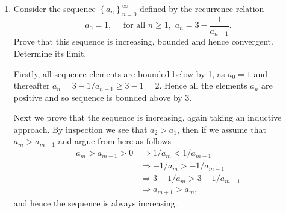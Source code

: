 \documentclass[oneside,10pt]{amsart}
\begin{document}
\begin{enumerate}
\begin{enumerate}
    \item
    Determine the limit.
    \begin{solution}
    Since we now know the limit exists let us denote it by $a$. Then by the algebra of limits theorem the limit $a$ satisfies
\begin{align*}
& a = \sqrt{2 a} \\
\Leftrightarrow \, \, & a = 2.
\end{align*}
\end{solution}
    \end{enumerate}
\item
Consider the sequence $\left \{ a_n \right \}_{n=0}^\infty$ defined by the recurrence relation
\[ a_0 = 1 , \quad \text{ for all } n \geq 1, \, \, a_{n} = 3 - \frac{1}{a_{n-1}}.\]
Prove that this sequence is increasing, bounded and hence convergent. Determine its limit.
\begin{solution}
Firstly, all sequence elements are bounded below by 1, as $a_0 = 1$ and thereafter $a_n = 3 - 1/a_{n-1} \geq 3 - 1 = 2$. Hence all the elements $a_n$ are positive and so sequence is bounded above by 3.

Next we prove that the sequence is increasing, again taking an inductive approach. By inspection we see that $a_2 > a_1$, then if we assume that $a_{m} > a_{m-1}$ and argue from here as follows
\begin{align*}
a_m > a_{m-1} > 0 &\Rightarrow 1/a_m < 1/a_{m-1} \\
&\Rightarrow  -1/a_m > -1/a_{m-1} \\
&\Rightarrow  3 -1/a_m > 3 -1/a_{m-1} \\
&\Rightarrow a_{m+1} > a_m,
\end{align*}
and hence the sequence is always increasing.


\end{solution}
\end{enumerate}
\end{document}
